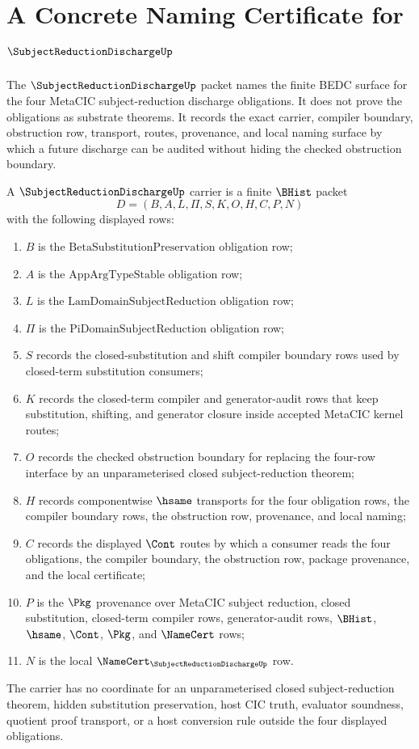 \chapter{A Concrete Naming Certificate for $\SubjectReductionDischargeUp$}
\label{ch:concrete-instances-subjectreductiondischarge-namecert}

The $\SubjectReductionDischargeUp$ packet names the finite BEDC surface for the four MetaCIC subject-reduction discharge obligations. It does not prove the obligations as substrate theorems. It records the exact carrier, compiler boundary, obstruction row, transport, routes, provenance, and local naming surface by which a future discharge can be audited without hiding the checked obstruction boundary.

\begin{definition}
\label{def:subject-reduction-discharge-carrier}
A $\SubjectReductionDischargeUp$ carrier is a finite $\BHist$ packet
$$
D=(B,A,L,\Pi,S,K,O,H,C,P,N)
$$
with the following displayed rows:
\begin{enumerate}
\item $B$ is the $\mathrm{BetaSubstitutionPreservation}$ obligation row;
\item $A$ is the $\mathrm{AppArgTypeStable}$ obligation row;
\item $L$ is the $\mathrm{LamDomainSubjectReduction}$ obligation row;
\item $\Pi$ is the $\mathrm{PiDomainSubjectReduction}$ obligation row;
\item $S$ records the closed-substitution and shift compiler boundary rows used by closed-term substitution consumers;
\item $K$ records the closed-term compiler and generator-audit rows that keep substitution, shifting, and generator closure inside accepted MetaCIC kernel routes;
\item $O$ records the checked obstruction boundary for replacing the four-row interface by an unparameterised closed subject-reduction theorem;
\item $H$ records componentwise $\hsame$ transports for the four obligation rows, the compiler boundary rows, the obstruction row, provenance, and local naming;
\item $C$ records the displayed $\Cont$ routes by which a consumer reads the four obligations, the compiler boundary, the obstruction row, package provenance, and the local certificate;
\item $P$ is the $\Pkg$ provenance over MetaCIC subject reduction, closed substitution, closed-term compiler rows, generator-audit rows, $\BHist$, $\hsame$, $\Cont$, $\Pkg$, and $\NameCert$ rows;
\item $N$ is the local $\NameCert_{\SubjectReductionDischargeUp}$ row.
\end{enumerate}
The carrier has no coordinate for an unparameterised closed subject-reduction theorem, hidden substitution preservation, host CIC truth, evaluator soundness, quotient proof transport, or a host conversion rule outside the four displayed obligations.
\end{definition}
